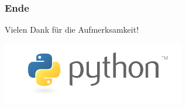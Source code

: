 \documentclass[10pt]{beamer}
\begin{document}
\begin{frame}
 \frametitle{Ende}
  \begin{center}
\begin{large}Vielen Dank für die Aufmerksamkeit!\end{large}
  \end{center}

  \begin{center}
   \includegraphics[width=80mm]{python-logo.png}
  \end{center}
\end{frame}
\end{document}
